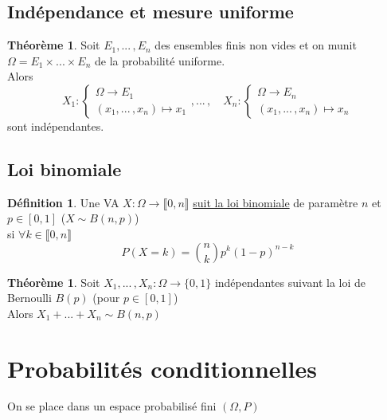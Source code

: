 \documentclass[10pt,a4paper]{article}
\theoremstyle{definition}
\newtheorem{theorem}[proposition]{Théorème}
\newtheorem{definition}[proposition]{Définition}
\begin{document}
\subsection{Indépendance et mesure uniforme}
\begin{theorem}
Soit $E_1, ...\,, E_n$ des ensembles finis non vides et on munit $\Omega = E_1 \times ... \times E_n$ de la probabilité uniforme. \\
Alors
\[ X_1: \begin{cases}
\Omega \to E_1 \\
(x_1, ...\,, x_n) \mapsto x_1
\end{cases}
, ...\,, \quad
X_n: \begin{cases}
\Omega \to E_n \\
(x_1, ...\,, x_n) \mapsto x_n
\end{cases} \]
sont indépendantes.
\end{theorem}

\subsection{Loi binomiale}
\begin{definition}
Une VA $X: \Omega \to \llbracket 0, n \rrbracket$ \uline{suit la loi binomiale} de paramètre $n$ et $p \in [ 0, 1 ]$ ($X \sim B(n, p)$) \\
si $\forall k \in \llbracket 0, n \rrbracket$
\[P(X = k) = \binom{n}{k} p^k (1 - p)^{n - k}\]
\end{definition}
\begin{theorem}
Soit $X_1, ...\,, X_n: \Omega \to \{ 0, 1 \}$ indépendantes suivant la loi de Bernoulli $B(p)$ (pour $p \in [0, 1]$) \\
Alors $X_1 + ... + X_n \sim B(n, p)$
\end{theorem}

\pagebreak

\section{Probabilités conditionnelles}
On se place dans un espace probabilisé fini $(\Omega, P)$
\end{document}
